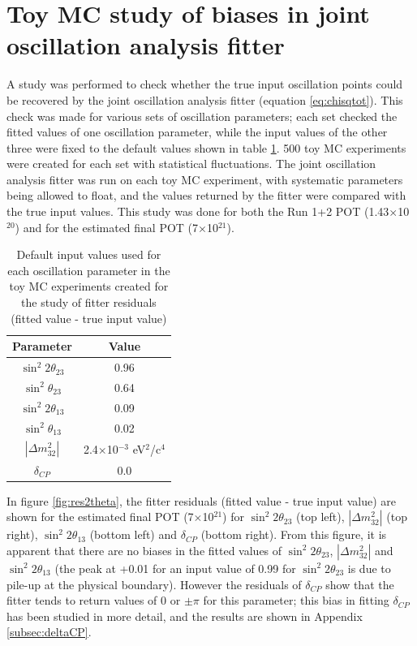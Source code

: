 \clearpage

\section{Toy MC study of biases in joint oscillation analysis fitter}
\label{app:fitterbias}

A study was performed to check whether the true input oscillation points could be recovered by the joint oscillation analysis fitter 
(equation \ref{eq:chisqtot}). This check was made for various sets of oscillation parameters; each set checked the fitted values of one oscillation 
parameter, while the input values of the other three were fixed to the default values shown in table \ref{tab:defaultvaluesresiduals}. 500 toy MC experiments 
were created for each set with statistical fluctuations. The joint oscillation analysis fitter was run on each toy MC experiment, with systematic parameters 
being allowed to float, and the values returned by the fitter were compared with the true input values. This study was done for both the Run 1+2 POT 
(1.43$\times$10$^{20}$) and for the estimated final POT (7$\times$10$^{21}$).

\begin{table}[h]
\centering
\begin{tabular}{|c|c|}
\hline
Parameter & Value \\
\hline \hline
$\sin^{2}2\theta_{23} $ &  0.96 \\
$\sin^{2}\theta_{23} $ & 0.64\\
$\sin^{2}2\theta_{13} $ &  0.09 \\
$\sin^{2}\theta_{13} $ & 0.02\\
$|\Delta m_{32}^{2}|$ & 2.4$\times$10$^{-3}$ eV$^{2}$/c$^{4}$ \\
$\delta_{CP}$ & 0.0 \\
\hline
\end{tabular}
\caption{Default input values used for each oscillation parameter in the toy MC experiments created for the study of fitter residuals (fitted value - true input value)}
\label{tab:defaultvaluesresiduals}
\end{table}

In figure \ref{fig:res2theta}, the fitter residuals (fitted value - true input value) are shown for the estimated final POT (7$\times$10$^{21}$) for 
$\sin^{2}2\theta_{23}$ (top left), $|\Delta m_{32}^{2}|$ (top right), $\sin^{2}2\theta_{13}$ (bottom left) and $\delta_{CP}$ (bottom right). From this figure, 
it is apparent that there are no biases in the fitted values of $\sin^{2}2\theta_{23}$, $|\Delta m_{32}^{2}|$ and $\sin^{2}2\theta_{13}$ (the peak at +0.01 for 
an input value of 0.99 for $\sin^{2}2\theta_{23}$ is due to pile-up at the physical boundary). However the residuals of $\delta_{CP}$ show that the fitter tends 
to return values of 0 or $\pm \pi$ for this parameter; this bias in fitting $\delta_{CP}$ has been studied in more detail, and the results are shown in 
Appendix \ref{subsec:deltaCP}. 

